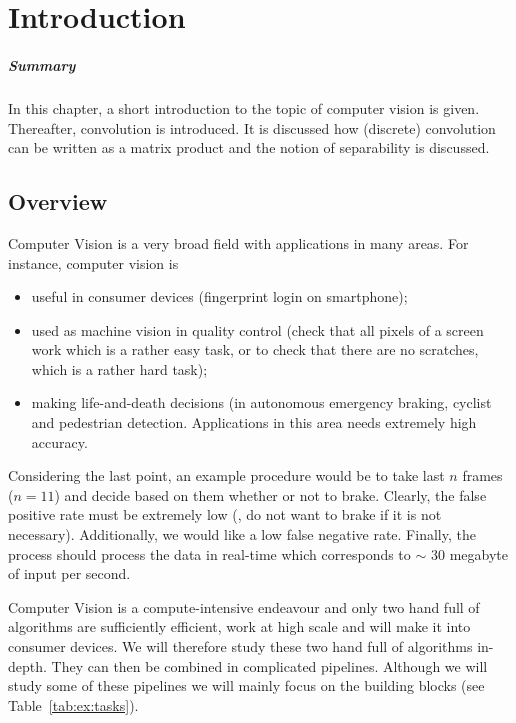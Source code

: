 \chapter{Introduction}
\paragraph{Summary} In this chapter, a short introduction to the topic of
computer vision is given. Thereafter, convolution is introduced. It is discussed
how (discrete) convolution can be written as a matrix product and the notion of
separability is discussed.

\section*{Overview}
Computer Vision is a very broad field with applications in many areas. For
instance, computer vision is
\begin{itemize}
\item useful in consumer devices (\eg fingerprint login on smartphone);
\item used as machine vision in quality control (\eg check that all pixels of a
  screen work which is a rather easy task, or to check that there are no
  scratches, which is a rather hard task);
\item making life-and-death decisions (\eg in autonomous emergency braking,
  cyclist and pedestrian detection. Applications in this area needs extremely
  high accuracy.
\end{itemize}
Considering the last point, an example procedure would be to take last $n$
frames (\eg $n = 11$) and decide based on them whether or not to brake. Clearly,
the false positive rate must be extremely low (\ie, do not want to brake if it
is not necessary). Additionally, we would like a low false negative
rate. Finally, the process should process the data in real-time which
corresponds to $\sim$ 30 megabyte of input per second.

Computer Vision is a compute-intensive endeavour and only two hand full of
algorithms are sufficiently efficient, \ie work at high scale and will make it
into consumer devices. We will therefore study these two hand full of algorithms
in-depth. They can then be combined in complicated pipelines. Although we will
study some of these pipelines we will mainly focus on the building blocks (see
Table~\ref{tab:ex:tasks}).

